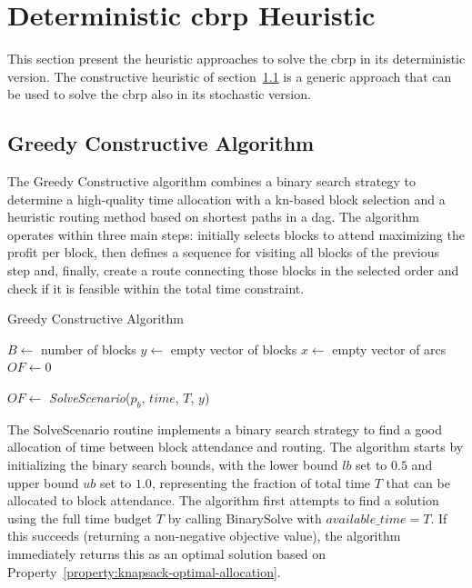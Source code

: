\section{Deterministic \gls{cbrp} Heuristic}\label{sec:deterministic-heuristics}

This section present the heuristic approaches to solve the \gls{cbrp} in its deterministic version. The constructive heuristic of section~\ref{sec:greedy-constructive-algorithm} is a generic approach that can be used to solve the \gls{cbrp} also in its stochastic version.

\newcommand{\Call}[2]{\textit{#1}(#2)}

\subsection{Greedy Constructive Algorithm}\label{sec:greedy-constructive-algorithm}

The Greedy Constructive algorithm combines a binary search strategy to determine a high-quality time allocation with a \gls{kn}-based block selection and a heuristic routing method based on shortest paths in a \gls{dag}. The algorithm operates within three main steps: initially selects blocks to attend maximizing the profit per block, then defines a sequence for visiting all blocks of the previous step and, finally, create a route connecting those blocks in the selected order and check if it is feasible within the total time constraint.

\begin{algorithm}[h!]
	\caption{Greedy Constructive Algorithm} \label{alg:greedy-constructive-algorithm}
	\SetAlgoLined

	$B \leftarrow$ number of blocks\;
	$y \leftarrow$ empty vector of blocks\;
	$x \leftarrow$ empty vector of arcs\;
	$OF \leftarrow 0$\;


	$OF \leftarrow$ \Call{SolveScenario}{$p_b$, $time$, $T$, $y$}\;

	\;
\end{algorithm}

The SolveScenario routine implements a binary search strategy to find a good allocation of time between block attendance and routing. The algorithm starts by initializing the binary search bounds, with the lower bound $lb$ set to $0.5$ and upper bound $ub$ set to $1.0$, representing the fraction of total time $T$ that can be allocated to block attendance. The algorithm first attempts to find a solution using the full time budget $T$ by calling BinarySolve with $available\_time = T$. If this succeeds (returning a non-negative objective value), the algorithm immediately returns this as an optimal solution based on Property~\ref{property:knapsack-optimal-allocation}.

